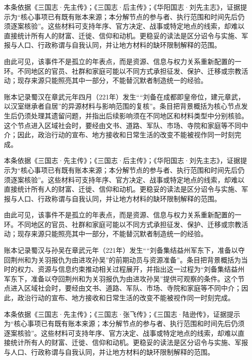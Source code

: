 本条依据《三国志·先主传》；《三国志·后主传》；《华阳国志·刘先主志》，证据提示为“核心事项已有既有账本来源；本分解节点的参与者、执行范围和时间先后仍须逐案核验”。这些材料可支持年序、官方决定、战事或特定地点的线索，却难以直接统计所有人的财富、迁徙、信仰和动机。更稳妥的读法是区分诏令与实施、军报与人口、行政称谓与自我认同，并让地方材料的缺环限制解释的范围。

由此可见，该事件不是孤立的年表点，而是资源、信息与权力关系重新配置的一环。不同地区的官员、社群和家庭可能以不同方式承担征发、保护、迁移或宗教活动；现存来源只能照亮其中一部分，不能替沉默者制造统一的经验。

账本记录蜀汉在章武元年四月（221年）发生““刘备在成都即皇帝位，建元章武，以汉室继承者自居”的异源材料与影响范围的复核”。条目把背景概括为核心节点发生后仍须处理其遗留问题，并指出后续影响须在不同地区和材料类型中分别核验。这个节点进入区域社会时，要经由文书、道路、军队、市场、寺院和家庭等不同中介；因此，政治行动的宣布、地方接收和日常生活的改变不能被视作同一时刻完成。

本条依据《三国志·先主传》；《三国志·后主传》；《华阳国志·刘先主志》，证据提示为“核心事项已有既有账本来源；本分解节点的参与者、执行范围和时间先后仍须逐案核验”。这些材料可支持年序、官方决定、战事或特定地点的线索，却难以直接统计所有人的财富、迁徙、信仰和动机。更稳妥的读法是区分诏令与实施、军报与人口、行政称谓与自我认同，并让地方材料的缺环限制解释的范围。

由此可见，该事件不是孤立的年表点，而是资源、信息与权力关系重新配置的一环。不同地区的官员、社群和家庭可能以不同方式承担征发、保护、迁移或宗教活动；现存来源只能照亮其中一部分，不能替沉默者制造统一的经验。

账本记录蜀汉与孙吴在章武元年（221年）发生““刘备集结益州军东下，准备以夺回荆州和为关羽报仇为由进攻孙吴”的前期动员与资源准备”。条目把背景概括为当时的权力、资源与信息约束推动相关过程展开，并指出这一过程为“刘备集结益州军东下，准备以夺回荆州和为关羽报仇为由进攻孙吴”提供可观察的条件。这个节点进入区域社会时，要经由文书、道路、军队、市场、寺院和家庭等不同中介；因此，政治行动的宣布、地方接收和日常生活的改变不能被视作同一时刻完成。

本条依据《三国志·先主传》；《三国志·张飞传》；《三国志·陆逊传》，证据提示为“核心事项已有既有账本来源；本分解节点的参与者、执行范围和时间先后仍须逐案核验”。这些材料可支持年序、官方决定、战事或特定地点的线索，却难以直接统计所有人的财富、迁徙、信仰和动机。更稳妥的读法是区分诏令与实施、军报与人口、行政称谓与自我认同，并让地方材料的缺环限制解释的范围。

